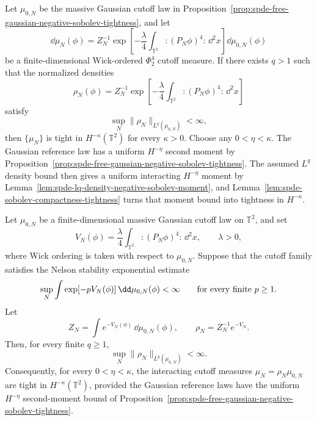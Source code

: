 \begin{remark}
\label{rem:spde-phi-four-two-density-tightness-route}
Let \(\mu_{0,N}\) be the massive Gaussian cutoff law in
Proposition~\ref{prop:spde-free-gaussian-negative-sobolev-tightness}, and
let
\[
  \dd\mu_N(\phi)
  =
  Z_N^{-1}
  \exp\!\left[
    -\frac{\lambda}{4}
    \int_{\mathbb T^2}:\!(P_N\phi)^4\!:\,\dd^2x
  \right]\dd\mu_{0,N}(\phi)
\]
be a finite-dimensional Wick-ordered \(\Phi^4_2\) cutoff measure.  If there
exists \(q>1\) such that the normalized densities
\[
  \rho_N(\phi)=
  Z_N^{-1}
  \exp\!\left[
    -\frac{\lambda}{4}
    \int_{\mathbb T^2}:\!(P_N\phi)^4\!:\,\dd^2x
  \right]
\]
satisfy
\[
  \sup_N\|\rho_N\|_{L^q(\mu_{0,N})}<\infty ,
\]
then \(\{\mu_N\}\) is tight in \(H^{-\kappa}(\mathbb T^2)\) for every
\(\kappa>0\).
Choose any \(0<\eta<\kappa\).  The Gaussian reference law has a uniform
\(H^{-\eta}\) second moment by
Proposition~\ref{prop:spde-free-gaussian-negative-sobolev-tightness}.  The
assumed \(L^q\) density bound then gives a uniform interacting
\(H^{-\eta}\) moment by
Lemma~\ref{lem:spde-lq-density-negative-sobolev-moment}, and
Lemma~\ref{lem:spde-sobolev-compactness-tightness} turns that moment
bound into tightness in \(H^{-\kappa}\).
\end{remark}

\begin{lemma}
\label{lem:spde-nelson-stability-implies-lq-density}
Let \(\mu_{0,N}\) be a finite-dimensional massive Gaussian cutoff law on
\(\mathbb T^2\), and set
\[
  V_N(\phi)=
  \frac{\lambda}{4}
  \int_{\mathbb T^2}:\!(P_N\phi)^4\!:\,\dd^2x ,
  \qquad \lambda>0,
\]
where Wick ordering is taken with respect to \(\mu_{0,N}\).  Suppose that
the cutoff family satisfies the Nelson stability exponential estimate
\begin{equation}
  \sup_N
  \int \exp[-pV_N(\phi)]\,\dd\mu_{0,N}(\phi)<\infty
  \qquad\hbox{for every finite }p\geq1 .
  \label{eq:spde-nelson-stability-exponential-input}
\end{equation}
Let
\[
  Z_N=\int e^{-V_N(\phi)}\,\dd\mu_{0,N}(\phi),
  \qquad
  \rho_N=Z_N^{-1}e^{-V_N}.
\]
Then, for every finite \(q\geq1\),
\[
  \sup_N\|\rho_N\|_{L^q(\mu_{0,N})}<\infty .
\]
Consequently, for every \(0<\eta<\kappa\), the interacting cutoff measures
\(\mu_N=\rho_N\mu_{0,N}\) are tight in \(H^{-\kappa}(\mathbb T^2)\), provided
the Gaussian reference laws have the uniform \(H^{-\eta}\) second-moment
bound of Proposition~\ref{prop:spde-free-gaussian-negative-sobolev-tightness}.
\end{lemma}

